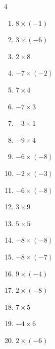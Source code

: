 \begin{multicols}{4}
\begin{enumerate}
  \item $8\times (-1)$
        \phantom{$=-8$}

  \item $3\times (-6)$
        \phantom{$=-18$}

  \item $2\times 8$
        \phantom{$=16$}

  \item $-7\times (-2)$
        \phantom{$=14$}

  \item $7\times 4$
        \phantom{$=28$}

  \item $-7\times 3$
        \phantom{$=-21$}

  \item $-3\times 1$
        \phantom{$=-3$}

  \item $-9\times 4$
        \phantom{$=-36$}

  \item $-6\times (-8)$
        \phantom{$=48$}

  \item $-2\times (-3)$
        \phantom{$=6$}

  \item $-6\times (-8)$
        \phantom{$=48$}

\columnbreak %

  \item $3\times 9$
        \phantom{$=27$}

  \item $5\times 5$
        \phantom{$=25$}

  \item $-8\times (-8)$
        \phantom{$=64$}

  \item $-8\times (-7)$
        \phantom{$=56$}

  \item $9\times (-4)$
        \phantom{$=-36$}

  \item $2\times (-8)$
        \phantom{$=-16$}

  \item $7\times 5$
        \phantom{$=35$}

  \item $-4\times 6$
        \phantom{$=-24$}

  \item $2\times (-6)$
        \phantom{$=-12$}


\end{enumerate}
\end{multicols}
